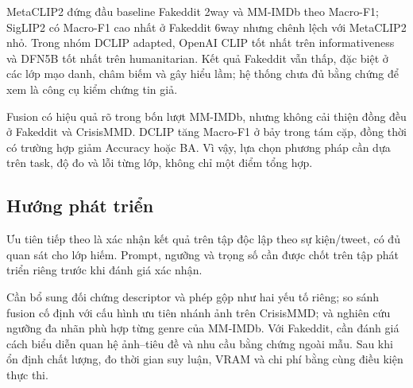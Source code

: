 \documentclass[12pt,a4paper]{article}
\begin{document}
MetaCLIP2 đứng đầu baseline Fakeddit 2way và MM-IMDb theo Macro-F1; SigLIP2 có Macro-F1 cao nhất ở Fakeddit 6way nhưng chênh lệch với MetaCLIP2 nhỏ. Trong nhóm DCLIP adapted, OpenAI CLIP tốt nhất trên informativeness và DFN5B tốt nhất trên humanitarian. Kết quả Fakeddit vẫn thấp, đặc biệt ở các lớp mạo danh, châm biếm và gây hiểu lầm; hệ thống chưa đủ bằng chứng để xem là công cụ kiểm chứng tin giả.

Fusion có hiệu quả rõ trong bốn lượt MM-IMDb, nhưng không cải thiện đồng đều ở Fakeddit và CrisisMMD. DCLIP tăng Macro-F1 ở bảy trong tám cặp, đồng thời có trường hợp giảm Accuracy hoặc BA. Vì vậy, lựa chọn phương pháp cần dựa trên task, độ đo và lỗi từng lớp, không chỉ một điểm tổng hợp.

\subsection{Hướng phát triển}
Ưu tiên tiếp theo là xác nhận kết quả trên tập độc lập theo sự kiện/tweet, có đủ quan sát cho lớp hiếm. Prompt, ngưỡng và trọng số cần được chốt trên tập phát triển riêng trước khi đánh giá xác nhận.

Cần bổ sung đối chứng descriptor và phép gộp như hai yếu tố riêng; so sánh fusion cố định với cấu hình ưu tiên nhánh ảnh trên CrisisMMD; và nghiên cứu ngưỡng đa nhãn phù hợp từng genre của MM-IMDb. Với Fakeddit, cần đánh giá cách biểu diễn quan hệ ảnh--tiêu đề và nhu cầu bằng chứng ngoài mẫu. Sau khi ổn định chất lượng, đo thời gian suy luận, VRAM và chi phí bằng cùng điều kiện thực thi.
\end{document}
